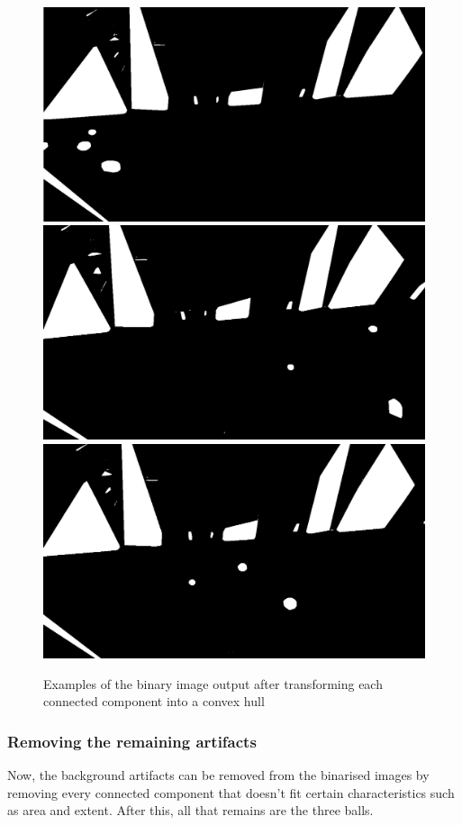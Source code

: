 \documentclass[conference]{IEEEtran}
\begin{document}
        \begin{figure}[htbp]
            \centering
            \includegraphics[width=0.49\columnwidth]{figures/convex3.png}
            \includegraphics[width=0.49\columnwidth]{figures/convex2.png}
            \includegraphics[width=0.49\columnwidth]{figures/convex.png}
            \caption{Examples of the binary image output after transforming each connected component into a convex hull~\label{fig:convex}}
        \end{figure}

        \subsubsection{Removing the remaining artifacts}

        Now, the background artifacts can be removed from the binarised images by removing every connected component that doesn't fit certain
        characteristics such as area and extent.
        After this, all that remains are the three balls.
\end{document}
